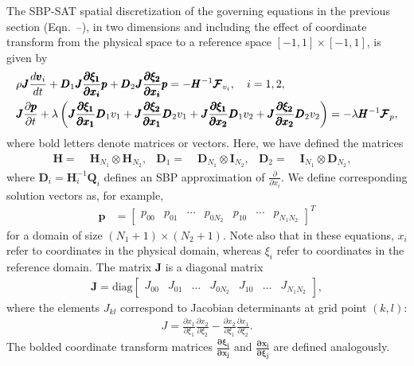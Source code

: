 The SBP-SAT spatial discretization of the governing equations in the previous section
(Eqn.~--), in two dimensions and including the
effect of coordinate transform from the physical space to a reference space
$[-1,1]\times[-1,1]$, is given by
\begin{align}
	&\rho \pmb{J} \frac{d \pmb{v}_{i}}{dt}
	+ \pmb{D}_{1} \pmb{J} \frac{ \pmb{\partial \xi_{1}}}{\pmb{\partial x_{i}}} \pmb{p}
	+ \pmb{D}_{2} \pmb{J}\frac{\pmb{\partial \xi_{2}}}{\pmb{\partial x_{i}}} \pmb{p} =
	- \pmb{{H}}^{-1}\pmb{\mathcal{F}}_{v_{i}}, \quad i=1,2,\\
	&\pmb{J}\frac{\partial \pmb{p}}{\partial t} +\lambda\left(
	\pmb{J}\frac{\pmb{\partial \xi_{1}}}{\pmb{\partial x_{1}}} \pmb{D}_{1} v_{1}
	+ \pmb{J}\frac{\pmb{\partial \xi_{2}}}{\pmb{\partial x_{1}}} \pmb{D}_{2} v_{1}
	+ \pmb{J}\frac{\pmb{\partial \xi_{1}}}{\pmb{\partial x_{2}}} \pmb{D}_{1} v_{2}
	+ \pmb{J}\frac{\pmb{\partial \xi_{2}}}{\pmb{\partial x_{2}}} \pmb{D}_{2} v_{2}
  \right)
  =
	-\lambda \pmb{H}^{-1} \pmb{\mathcal{F}}_{p},
\end{align}
where bold letters denote matrices or vectors. Here, we have defined the matrices
\begin{align}
	\pmb{H}     =\;& \pmb{H}_{N_{1}}\otimes \pmb{H}_{N_{2}},&
	\pmb{D}_{1} =\;& \pmb{D}_{N_{1}}\otimes \pmb{I}_{N_{2}},&
	\pmb{D}_{2} =\;& \pmb{I}_{N_{1}}\otimes \pmb{D}_{N_{2}},&
\end{align}
where $\pmb{D}_{i} = \pmb{H}_{i}^{-1}\pmb{Q}_{i}$ defines an SBP approximation of $\frac{\partial}{\partial x_{i}}$.
We define corresponding solution vectors as, for example,
\begin{align}
  \pmb{p} &=
  \begin{bmatrix}
    p_{00} & p_{01} & \cdots & p_{0N_{2}} & p_{10} & \cdots & p_{N_{1}N_{2}}
  \end{bmatrix}^{T}
\end{align}
for a domain of size $(N_{1}+1) \times (N_{2}+1)$.
Note also that in these equations, $x_{i}$ refer to coordinates in the physical domain,
whereas $\xi_{i}$ refer to coordinates in the reference domain. The matrix $\pmb{J}$ is
a diagonal matrix
\begin{align}
  \pmb{J} = \text{diag}
  \begin{bmatrix}
	  J_{00} & J_{01} & \hdots & J_{0N_{2}} & J_{10} & \hdots & J_{N_{1}N_{2}} \label{eq:sbp_jac}
  \end{bmatrix},
\end{align}
where the elements $J_{kl}$ correspond to Jacobian determinants at grid point $(k,l)$:
\begin{align}
J = \frac{\partial x_{1}}{\partial \xi_{1}} \frac{\partial x_{2}}{\partial \xi_{2}} -
    \frac{\partial x_{2}}{\partial \xi_{1}} \frac{\partial x_{1}}{\partial \xi_{2}}.
\end{align}
The bolded coordinate transform matrices $\frac{\pmb{\partial \xi_{i}}}{\pmb{\partial x_{j}}}$
and $\frac{\pmb{\partial x_{i}}}{\pmb{\partial \xi_{j}}}$ are defined analogously.

